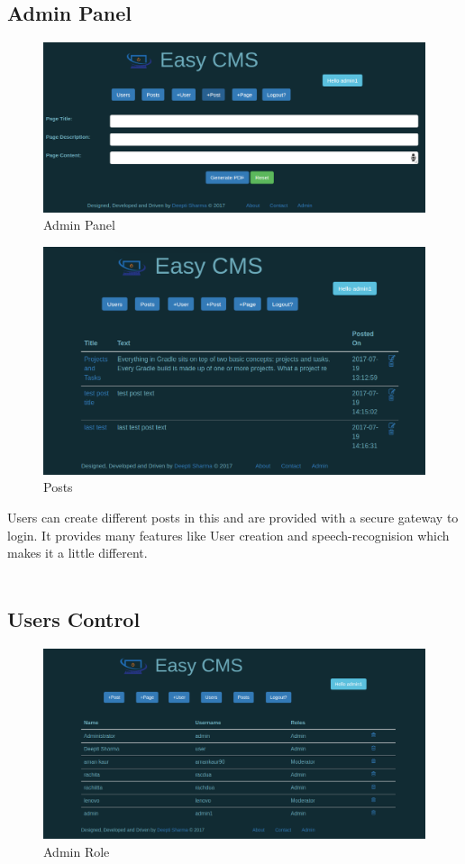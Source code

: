 \subsection{Admin Panel}
\begin{figure}[h!]
	\centering \includegraphics[scale=.45]{input/images/easy3.png}
	\caption{Admin Panel}
\end{figure}

\begin{figure}[h!]
	\centering \includegraphics[scale=.49]{input/images/posts.png}
	\caption{Posts}
\end{figure}
Users can create different posts in this and are provided with a secure gateway to login. It provides many features like User creation and speech-recognision which makes it a little different.\\\\


\subsection{Users Control}
\begin{figure}[h!]
	\centering \includegraphics[scale=.44]{input/images/new.png}
	\caption{Admin Role}
\end{figure}

